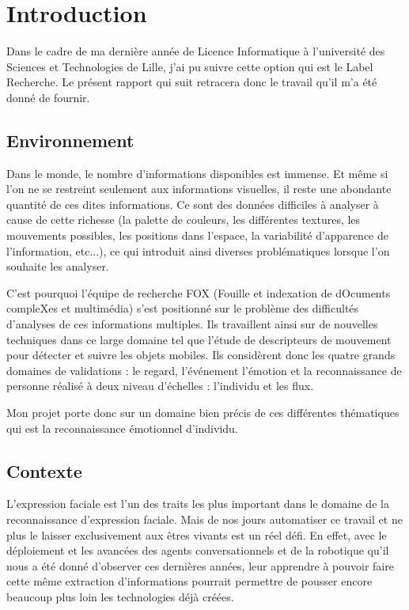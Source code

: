\documentclass[12pt]{article}
\begin{document}
\pagebreak

\section{Introduction}

Dans le cadre de ma dernière année de Licence Informatique à l'université des Sciences et Technologies de Lille, j'ai pu suivre cette option qui est le Label Recherche. Le présent rapport qui suit retracera donc le travail qu'il m'a été donné de fournir.

\subsection{Environnement}

Dans le monde, le nombre d'informations disponibles est immense. Et même si l'on ne se restreint seulement aux informations visuelles, il reste une abondante quantité de ces dites informations. Ce sont des données difficiles à analyser à cause de cette richesse (la palette de couleurs, les différentes textures, les mouvements possibles, les positions dans l'espace, la variabilité d'apparence de l’information, etc...), ce qui introduit ainsi diverses problématiques lorsque l'on souhaite les analyser.

C'est pourquoi l'équipe de recherche FOX (Fouille et indexation de dOcuments compleXes et multimédia) s'est positionné sur le problème des difficultés d'analyses de ces informations multiples. Ils travaillent ainsi sur de nouvelles techniques dans ce large domaine tel que l'étude de descripteurs de mouvement pour détecter et suivre les objets mobiles. Ils considèrent donc les quatre grands domaines de validations : le regard, l’événement l'émotion et la reconnaissance de personne réalisé à deux niveau d'échelles : l'individu et les flux.

Mon projet porte donc sur un domaine bien précis de ces différentes thématiques qui est la reconnaissance émotionnel d'individu.

\subsection{Contexte}

L'expression faciale est l'un des traits les plus important dans le domaine de la reconnaissance d'expression faciale\cite{darwin}. Mais de nos jours automatiser ce travail et ne plus le laisser exclusivement aux êtres vivants est un réel défi. En effet, avec le déploiement et les avancées des agents conversationnels et de la robotique qu'il nous a été donné d'observer ces dernières années, leur apprendre à pouvoir faire cette même extraction d'informations pourrait permettre de pousser encore beaucoup plus loin les technologies déjà créées. %
\end{document}
